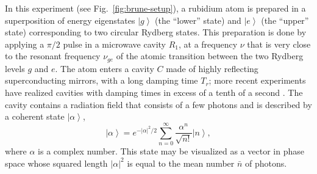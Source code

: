 \documentclass[3p,sort&compress,12pt]{elsarticle}
\newcommand{\ket}[1]{\left\vert{#1}\right\rangle}
\providecommand{\abs}[1]{\left\lvert#1\right\rvert}
\newcommand{\E}{\ensuremath{e}}
\begin{document}
In this experiment (see Fig.~\ref{fig:brune-setup}), a rubidium atom is prepared in a superposition of energy eigenstates $\ket{g}$ (the ``lower'' state) and $\ket{e}$ (the ``upper'' state) corresponding to two circular Rydberg states. This preparation is done by applying a $\pi/2$ pulse in a microwave   cavity $R_1$, at a frequency $\nu$ that is very close to the resonant frequency $\nu_{ge}$ of the atomic transition between the two Rydberg levels $g$ and $e$. The atom enters a cavity $C$ made of highly reflecting superconducting mirrors, with a long damping time $T_r$; more recent experiments have realized cavities with damping times in excess of a tenth of a second \cite{Kuhr:2007:aa,Deleglise:2008:oo}. The cavity contains a radiation field that consists of a few photons and is described by a coherent state $\ket{\alpha}$, 
%
\begin{equation}
\ket{\alpha} = \E^{- \abs{\alpha}^2 /2}\sum_{n=0}^\infty \frac{\alpha^n}{\sqrt{n!}}\ket{n},
\end{equation}
%
where $\alpha$ is a complex number. This state may be visualized as a vector in phase space whose squared length $\abs{\alpha}^2$ is equal to the  mean number $\bar{n}$ of photons. 
\end{document}
